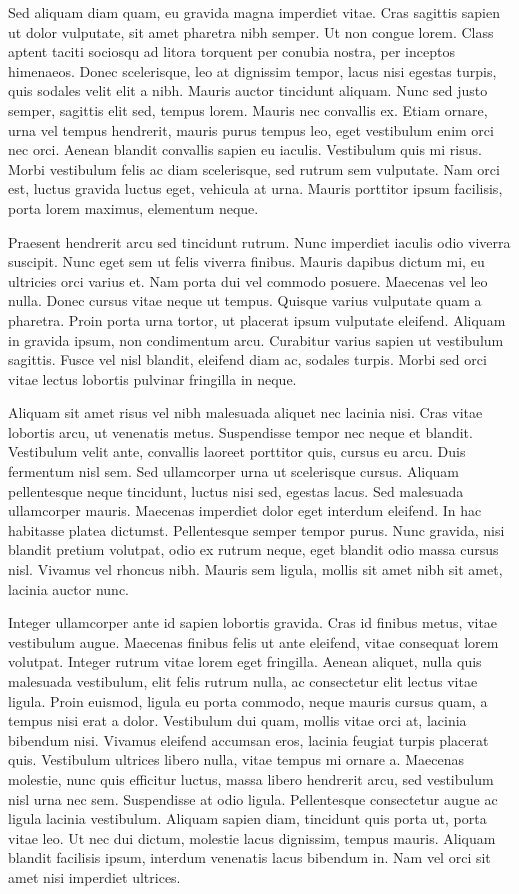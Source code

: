 Sed aliquam diam quam, eu gravida magna imperdiet vitae. Cras sagittis sapien ut dolor vulputate, sit amet pharetra nibh semper. Ut non congue lorem. Class aptent taciti sociosqu ad litora torquent per conubia nostra, per inceptos himenaeos. Donec scelerisque, leo at dignissim tempor, lacus nisi egestas turpis, quis sodales velit elit a nibh. Mauris auctor tincidunt aliquam. Nunc sed justo semper, sagittis elit sed, tempus lorem. Mauris nec convallis ex. Etiam ornare, urna vel tempus hendrerit, mauris purus tempus leo, eget vestibulum enim orci nec orci. Aenean blandit convallis sapien eu iaculis. Vestibulum quis mi risus. Morbi vestibulum felis ac diam scelerisque, sed rutrum sem vulputate. Nam orci est, luctus gravida luctus eget, vehicula at urna. Mauris porttitor ipsum facilisis, porta lorem maximus, elementum neque.

Praesent hendrerit arcu sed tincidunt rutrum. Nunc imperdiet iaculis odio viverra suscipit. Nunc eget sem ut felis viverra finibus. Mauris dapibus dictum mi, eu ultricies orci varius et. Nam porta dui vel commodo posuere. Maecenas vel leo nulla. Donec cursus vitae neque ut tempus. Quisque varius vulputate quam a pharetra. Proin porta urna tortor, ut placerat ipsum vulputate eleifend. Aliquam in gravida ipsum, non condimentum arcu. Curabitur varius sapien ut vestibulum sagittis. Fusce vel nisl blandit, eleifend diam ac, sodales turpis. Morbi sed orci vitae lectus lobortis pulvinar fringilla in neque.

Aliquam sit amet risus vel nibh malesuada aliquet nec lacinia nisi. Cras vitae lobortis arcu, ut venenatis metus. Suspendisse tempor nec neque et blandit. Vestibulum velit ante, convallis laoreet porttitor quis, cursus eu arcu. Duis fermentum nisl sem. Sed ullamcorper urna ut scelerisque cursus. Aliquam pellentesque neque tincidunt, luctus nisi sed, egestas lacus. Sed malesuada ullamcorper mauris. Maecenas imperdiet dolor eget interdum eleifend. In hac habitasse platea dictumst. Pellentesque semper tempor purus. Nunc gravida, nisi blandit pretium volutpat, odio ex rutrum neque, eget blandit odio massa cursus nisl. Vivamus vel rhoncus nibh. Mauris sem ligula, mollis sit amet nibh sit amet, lacinia auctor nunc.

Integer ullamcorper ante id sapien lobortis gravida. Cras id finibus metus, vitae vestibulum augue. Maecenas finibus felis ut ante eleifend, vitae consequat lorem volutpat. Integer rutrum vitae lorem eget fringilla. Aenean aliquet, nulla quis malesuada vestibulum, elit felis rutrum nulla, ac consectetur elit lectus vitae ligula. Proin euismod, ligula eu porta commodo, neque mauris cursus quam, a tempus nisi erat a dolor. Vestibulum dui quam, mollis vitae orci at, lacinia bibendum nisi. Vivamus eleifend accumsan eros, lacinia feugiat turpis placerat quis. Vestibulum ultrices libero nulla, vitae tempus mi ornare a. Maecenas molestie, nunc quis efficitur luctus, massa libero hendrerit arcu, sed vestibulum nisl urna nec sem. Suspendisse at odio ligula. Pellentesque consectetur augue ac ligula lacinia vestibulum. Aliquam sapien diam, tincidunt quis porta ut, porta vitae leo. Ut nec dui dictum, molestie lacus dignissim, tempus mauris. Aliquam blandit facilisis ipsum, interdum venenatis lacus bibendum in. Nam vel orci sit amet nisi imperdiet ultrices.

